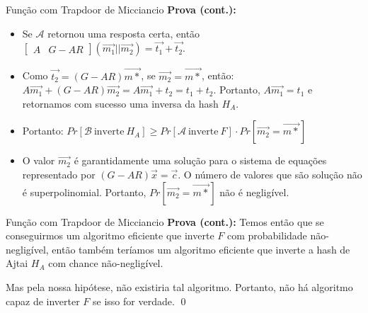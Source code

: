 \documentclass{beamer}
\begin{document}
\begin{frame}{Função com Trapdoor de Micciancio}
\textbf{Prova (cont.):} 
\begin{itemize}
\item Se $\mathcal{A}$ retornou uma resposta certa,  então $\begin{bmatrix}A&G-AR\end{bmatrix}(\overrightarrow{m_1}||\overrightarrow{m_2})=\overrightarrow{t_1}+\overrightarrow{t_2}$.
    
\item Como $\overrightarrow{t_2} = (G-AR)\overrightarrow{m*}$, se $\overrightarrow{m_2}=\overrightarrow{m*}$, então: $A\overrightarrow{m_1} + (G-AR)\overrightarrow{m_2} = A\overrightarrow{m_1} + t_2 = t_1+t_2$. Portanto, $A\overrightarrow{m_1} = t_1$ e retornamos com sucesso uma inversa da hash $H_A$.
\item Portanto: $Pr[\mathcal{B}\ \textrm{inverte}\ H_A] \geq Pr[\mathcal{A}\ \textrm{inverte}\ F]\cdot Pr[\overrightarrow{m_2}=\overrightarrow{m*}]$
\item O valor $\overrightarrow{m_2}$ é garantidamente uma solução para o sistema de equações representado por $(G-AR)\overrightarrow{x}=\overrightarrow{c}$. O número de valores que são solução não é superpolinomial. Portanto, $Pr[\overrightarrow{m_2}=\overrightarrow{m*}]$ não é negligível.
\end{itemize}
\end{frame}

\begin{frame}{Função com Trapdoor de Micciancio}
\textbf{Prova (cont.):} Temos então que se conseguirmos um algoritmo eficiente que inverte $F$ com probabilidade não-negligível, então também teríamos um algoritmo eficiente que inverte a hash de Ajtai $H_A$ com chance não-negligível.

Mas pela nossa hipótese, não existiria tal algoritmo. Portanto, não há algoritmo capaz de inverter $F$ se isso for verdade. \qed

\end{frame}
\end{document}
